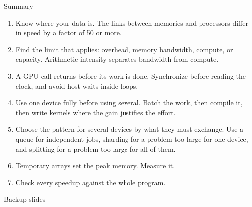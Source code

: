 \documentclass[aspectratio=169,10pt]{beamer}
\begin{document}
\begin{frame}{Summary}
  \medskip
  {\small
  \begin{enumerate}
    \item Know where your data is.  The links between memories and processors
      differ in speed by a factor of 50 or more.\vspace{1pt}
    \item Find the limit that applies: overhead, memory bandwidth, compute, or
      capacity.  Arithmetic intensity separates bandwidth from
      compute.\vspace{1pt}
    \item A GPU call returns before its work is done.  Synchronize before
      reading the clock, and avoid host waits inside loops.\vspace{1pt}
    \item Use one device fully before using several.  Batch the work, then
      compile it, then write kernels where the gain justifies the
      effort.\vspace{1pt}
    \item Choose the pattern for several devices by what they must exchange.
      Use a queue for independent jobs, sharding for a problem too large for
      one device, and splitting for a problem too large for all of
      them.\vspace{1pt}
    \item Temporary arrays set the peak memory.  Measure it.\vspace{1pt}
    \item Check every speedup against the whole program.
  \end{enumerate}}
\end{frame}

\appendix

\begin{frame}[standout]
  Backup slides
\end{frame}
\end{document}
